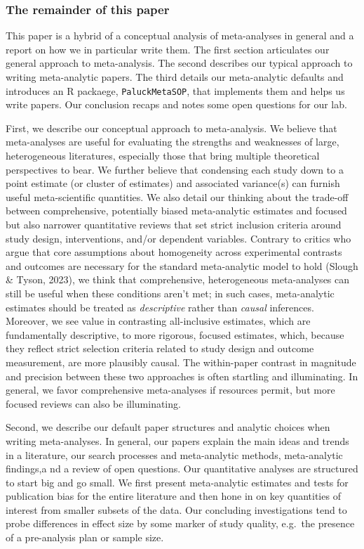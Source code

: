 \documentclass[
  man]{apa6}
\begin{document}
\subsubsection{The remainder of this paper}\label{the-remainder-of-this-paper}

This paper is a hybrid of a conceptual analysis of meta-analyses in general and a report on how we in particular write them. The first section articulates our general approach to meta-analysis. The second describes our typical approach to writing meta-analytic papers. The third details our meta-analytic defaults and introduces an R packaege, \texttt{PaluckMetaSOP}, that implements them and helps us write papers. Our conclusion recaps and notes some open questions for our lab.

First, we describe our conceptual approach to meta-analysis. We believe that meta-analyses are useful for evaluating the strengths and weaknesses of large, heterogeneous literatures, especially those that bring multiple theoretical perspectives to bear. We further believe that condensing each study down to a point estimate (or cluster of estimates) and associated variance(s) can furnish useful meta-scientific quantities. We also detail our thinking about the trade-off between comprehensive, potentially biased meta-analytic estimates and focused but also narrower quantitative reviews that set strict inclusion criteria around study design, interventions, and/or dependent variables. Contrary to critics who argue that core assumptions about homogeneity across experimental contrasts and outcomes are necessary for the standard meta-analytic model to hold (Slough \& Tyson, 2023), we think that comprehensive, heterogeneous meta-analyses can still be useful when these conditions aren't met; in such cases, meta-analytic estimates should be treated as \emph{descriptive} rather than \emph{causal} inferences. Moreover, we see value in contrasting all-inclusive estimates, which are fundamentally descriptive, to more rigorous, focused estimates, which, because they reflect strict selection criteria related to study design and outcome measurement, are more plausibly causal. The within-paper contrast in magnitude and precision between these two approaches is often startling and illuminating. In general, we favor comprehensive meta-analyses if resources permit, but more focused reviews can also be illuminating.

Second, we describe our default paper structures and analytic choices when writing meta-analyses. In general, our papers explain the main ideas and trends in a literature, our search processes and meta-analytic methods, meta-analytic findings,a nd a review of open questions. Our quantitative analyses are structured to start big and go small. We first present meta-analytic estimates and tests for publication bias for the entire literature and then hone in on key quantities of interest from smaller subsets of the data. Our concluding investigations tend to probe differences in effect size by some marker of study quality, e.g.~the presence of a pre-analysis plan or sample size.
\end{document}
